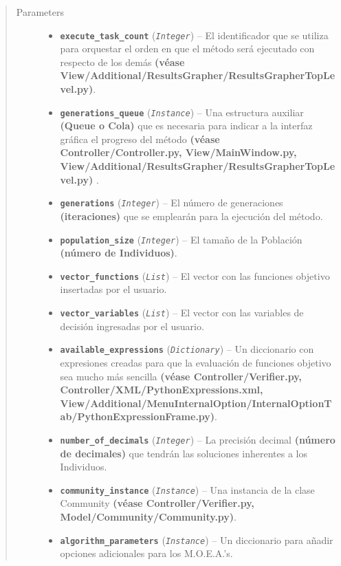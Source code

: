\documentclass[class=report, crop=false]{standalone}
\begin{document}
\begin{fulllineitems}
\begin{quote}\begin{description}
\item[{Parameters}] \leavevmode\begin{itemize}
\item \textbf{\texttt{execute\_task\_count}} (\emph{\texttt{Integer}}) -- El identificador que se utiliza para orquestar el orden en que el método será ejecutado con respecto de los demás \textbf{(véase View/Additional/}\break\textbf{ResultsGrapher/ResultsGrapherTopLevel.py)}.
\item \textbf{\texttt{generations\_queue}} (\emph{\texttt{Instance}}) -- Una estructura auxiliar \textbf{(Queue o Cola)} que es necesaria para indicar a la interfaz gráfica el progreso del método \textbf{(véase Controller/Controller.py, View/MainWindow.py, View/Additional/}\break\textbf{ResultsGrapher/ResultsGrapherTopLevel.py)} .
\item \textbf{\texttt{generations}} (\emph{\texttt{Integer}}) -- El número de generaciones \textbf{(iteraciones)} que se emplearán para la ejecución del método.
\item \textbf{\texttt{population\_size}} (\emph{\texttt{Integer}}) -- El tamaño de la Población \textbf{(número de Individuos)}.
\item \textbf{\texttt{vector\_functions}} (\emph{\texttt{List}}) -- El vector con las funciones objetivo insertadas por el usuario.
\item \textbf{\texttt{vector\_variables}} (\emph{\texttt{List}}) -- El vector con las variables de decisión ingresadas por el usuario.
\item \textbf{\texttt{available\_expressions}} (\emph{\texttt{Dictionary}}) -- Un diccionario con expresiones creadas para que la evaluación de funciones objetivo sea mucho más sencilla \textbf{(véase Controller/Verifier.py, Controller/XML/PythonExpressions.xml, View/Additional/MenuInternalOption/InternalOptionTab/}\break\textbf{PythonExpressionFrame.py)}.
\item \textbf{\texttt{number\_of\_decimals}} (\emph{\texttt{Integer}}) -- La precisión decimal \textbf{(número de decimales)} que tendrán las soluciones inherentes a los Individuos.
\item \textbf{\texttt{community\_instance}} (\emph{\texttt{Instance}}) -- Una instancia de la clase Community \textbf{(véase Controller/Verifier.py, Model/Community/Community.py)}.
\item \textbf{\texttt{algorithm\_parameters}} (\emph{\texttt{Instance}}) -- Un diccionario para añadir opciones adicionales para los M.O.E.A.'s.

\end{itemize}
\end{description}
\end{quote}
\end{fulllineitems}
\end{document}
